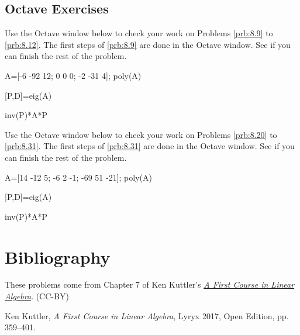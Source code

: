 \documentclass{ximera}
\begin{document}
\subsection*{Octave Exercises}
\begin{problem}\label{oct:char_poly}
Use the Octave window below to check your work on Problems \ref{prb:8.9} to \ref{prb:8.12}.  The first steps of \ref{prb:8.9} are done in the Octave window.  See if you can finish the rest of the problem.

A=[-6 -92 12; 0 0 0; -2 -31 4];
poly(A)


[P,D]=eig(A)

inv(P)*A*P

\end{problem}

\begin{problem}\label{oct:diagonalize}
Use the Octave window below to check your work on Problems \ref{prb:8.20} to \ref{prb:8.31}.  The first steps of \ref{prb:8.31} are done in the Octave window.  See if you can finish the rest of the problem.

A=[14 -12 5; -6 2 -1; -69 51 -21];
poly(A)

[P,D]=eig(A)

inv(P)*A*P


\end{problem}


\section*{Bibliography}
These problems come from Chapter 7 of Ken Kuttler's \href{https://open.umn.edu/opentextbooks/textbooks/a-first-course-in-linear-algebra-2017}{\it A First Course in Linear Algebra}. (CC-BY)

Ken Kuttler, {\it  A First Course in Linear Algebra}, Lyryx 2017, Open Edition, pp. 359--401. 
\end{document}
